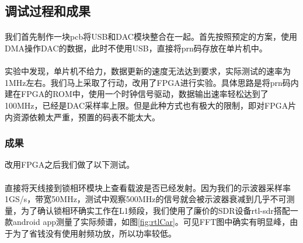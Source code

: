\documentclass[UTF8,titlepage]{ctexart}
\begin{document}
\subsection*{调试过程和成果}
\paragraph*{}我们首先制作一块pcb将USB和DAC模块整合在一起。首先按照预定的方案，使用DMA操作DAC的数据，此时不使用USB，直接将prn码存放在单片机中。
\paragraph*{}实验中发现，单片机不给力，数据更新的速度无法达到要求，实际测试的速率为1MHz左右。我们马上采取了行动，改用了FPGA进行实验。具体思路是将prn码内建在FPGA的ROM中，使用一个时钟信号驱动，数据输出速率轻松达到了100MHz，已经是DAC采样率上限。但是此种方式也有极大的限制，即对FPGA片内资源依赖太严重，预置的码表不能太大。
\subsubsection*{成果} 改用FPGA之后我们做了以下测试。
\paragraph*{}直接将天线接到锁相环模块上查看载波是否已经发射。因为我们的示波器采样率1GS/s，带宽50MHz，测试中观察500MHz的信号就会被示波器衰减到几乎不可测量，为了确认锁相环确实工作在L1频段，我们使用了廉价的SDR设备rtl-sdr搭配一款android app测量了实际频谱，如图\ref{fig:rtlCar}。可见FFT图中确实有明显峰，由于为了省钱没有使用射频功放，所以功率较低。
\end{document}
